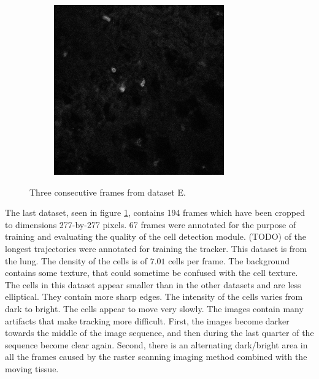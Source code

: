 \begin{figure}[h]
\begin{subfigure}{.32\textwidth}
		\end{subfigure}
		\hfill
		\begin{subfigure}{.32\textwidth}
		\includegraphics[width=\textwidth]{images/seriesm170_13cropped018}
		\end{subfigure}
		\caption{Three consecutive frames from dataset E.}
		\label{fig:data_datasetE}
	\end{figure}
        
    The last dataset, seen in figure \cref{fig:data_datasetE}, contains 194 frames which have been cropped to dimensions 277-by-277 pixels. 67 frames were annotated for the purpose of training and evaluating the quality of the cell detection module. (TODO) of the longest trajectories were annotated for training the tracker. This dataset is from the lung. The density of the cells is of $7.01$ cells per frame. The background contains some texture, that could sometime be confused with the cell texture. The cells in this dataset appear smaller than in the other datasets and are less elliptical. They contain more sharp edges. The intensity of the cells varies from dark to bright. The cells appear to move very slowly. The images contain many artifacts that make tracking more difficult. First, the images become darker towards the middle of the image sequence, and then during the last quarter of the sequence become clear again. Second, there is an alternating dark/bright area in all the frames caused by the raster scanning imaging method combined with the moving tissue.
    	
